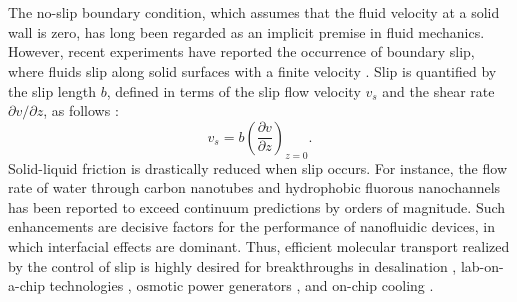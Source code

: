 \documentclass[journal=jacsat,manuscript=article]{achemso}
\begin{document}

\section*{}
The no-slip boundary condition, which assumes that the fluid velocity at a solid wall is zero, has long been regarded as an implicit premise in fluid mechanics. However, recent experiments have reported the occurrence of boundary slip, where fluids slip along solid surfaces with a finite velocity \cite{Huang2007-kv, Chen2022-hs, Cross2018-bc, Zhu2012-wb, Vinogradova1995-ct, Vinogradova2003-gh, Li2022-qs}. Slip is quantified by the slip length \(b\), defined in terms of the slip flow velocity \(v_{s}\) and the shear rate \(\partial v / \partial z \), as follows \cite{Navier1827-nw}: 
\begin{equation}
  v_s = b \left( \frac{\partial v}{\partial z} \right)_{z=0}. \label{eqn:definition of slip length}
\end{equation}
Solid-liquid friction is drastically reduced when slip occurs. For instance, the flow rate of water through carbon nanotubes \cite{Holt2006-yw} and hydrophobic fluorous nanochannels \cite{Itoh2022-hd} has been reported to exceed continuum predictions by orders of magnitude. Such enhancements are decisive factors for the performance of nanofluidic devices, in which interfacial effects are dominant. Thus, efficient molecular transport realized by the control of slip is highly desired for breakthroughs in desalination \cite{Itoh2022-hd}, lab-on-a-chip technologies \cite{Shuvo2025-xv}, osmotic power generators \cite{Laucirica2021-fw, Ma2021-sr}, and on-chip cooling \cite{Sarvar2025-xk, Van_Erp2020-rm}.
\end{document}
